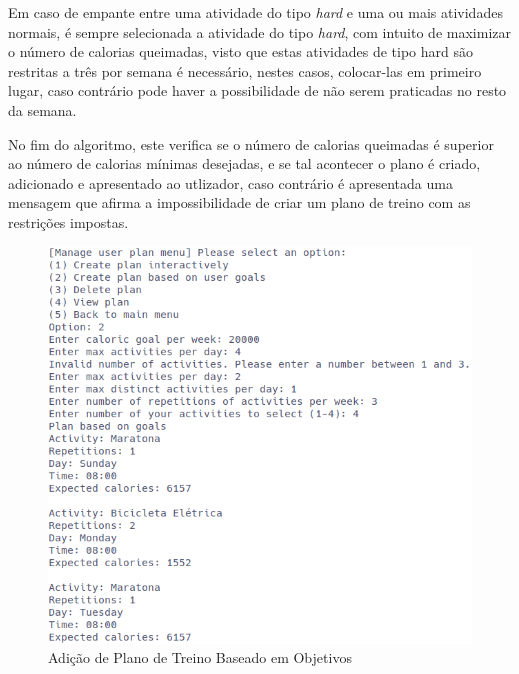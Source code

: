 \documentclass[a4paper,12pt]{scrreprt}
\begin{document}
    Em caso de empante entre uma atividade do tipo \textit{hard} e uma ou mais atividades normais,
    é sempre selecionada a atividade do tipo \textit{hard}, com intuito de maximizar o número de calorias queimadas,
    visto que estas atividades de tipo hard são restritas a três por semana é necessário, nestes casos, colocar-las em primeiro
    lugar, caso contrário pode haver a possibilidade de não serem praticadas no resto da semana.

    No fim do algoritmo, este verifica se o número de calorias queimadas é superior ao número de calorias mínimas desejadas,
    e se tal acontecer o plano é criado, adicionado e apresentado ao utlizador, caso contrário é apresentada uma mensagem que
    afirma a impossibilidade de criar um plano de treino com as restrições impostas.

    \begin{figure}[!ht]
        \centering
        \includegraphics[width=\textwidth]{images/createPlanGoals1.png}
        \caption{Adição de Plano de Treino Baseado em Objetivos}
        \label{fig:add-plan-goals-1}
    \end{figure}
\end{document}
